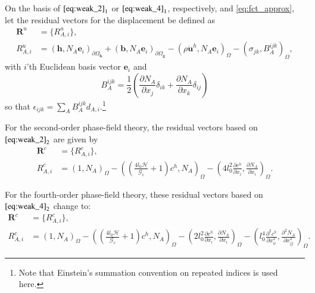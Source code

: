 On the basis of $\eqref{eq:weak_2}_{1}$ or $\eqref{eq:weak_4}_{1}$, respectively, and \eqref{eq:fct_approx}, let the residual vectors for the displacement be defined as
\begin{equation} \label{eq:res_vecs_u}
	\begin{aligned}
		\mathbf{R}^{u}&=\{R_{A,i}^{u}\}, \\
		R_{A,i}^{u} &= \left(\mathbf{h},N_{A}\mathbf{e}_{i}\right)_{\partial\Omega_{\mathbf{h}}} + \left(\mathbf{b},N_{A}\mathbf{e}_{i}\right)_{\partial\Omega_{\mathbf{g}}} - \left(\rho\ddot{\mathbf{u}}^{h},N_{A}\mathbf{e}_{i}\right)_{\Omega}-\left(\sigma_{jk},B_{A}^{ijk}\right)_{\Omega},
	\end{aligned}
\end{equation}
with $i$'th Euclidean basis vector $\mathbf{e}_{i}$ and
\begin{equation}
	B_{A}^{ijk}=\frac{1}{2}\left(\frac{\partial N_{A}}{\partial x_{j}}\delta_{ik}+\frac{\partial N_{A}}{\partial x_{k}}\delta_{ij}\right)
\end{equation}
so that $\epsilon_{ijk}=\sum_{A}B_{A}^{ijk}d_{A,i}$.\footnote{Note that Einstein's summation convention on repeated indices is used here.}

For the second-order phase-field theory, the residual vectors based on $\eqref{eq:weak_2}_{2}$ are given by
\begin{equation} \label{eq:res_vecs_c2}
	\begin{aligned}
		\mathbf{R}^{c}&=\{R_{A,i}^{c}\}, \\
		R_{A,i}^{c} &= \left(1,N_{A}\right)_{\Omega} - \left(\left(\frac{4l_{0}\mathcal{H}}{\mathcal{G}_{c}}+1\right)c^{h},N_{A}\right)_{\Omega} - \left(4l_{0}^{2}\frac{\partial c^{h}}{\partial x_{i}},\frac{\partial N_{A}}{\partial x_{i}}\right)_{\Omega}.
	\end{aligned}
\end{equation}

For the fourth-order phase-field theory, these residual vectors based on $\eqref{eq:weak_4}_{2}$ change to:
\begin{equation} \label{eq:res_vecs_c4}
	\begin{aligned}
		\mathbf{R}^{c}&=\{R_{A,i}^{c}\}, \\
		R_{A,i}^{c} &= \left(1,N_{A}\right)_{\Omega} - \left(\left(\frac{4l_{0}\mathcal{H}}{\mathcal{G}_{c}}+1\right)c^{h},N_{A}\right)_{\Omega} - \left(2l_{0}^{2}\frac{\partial c^{h}}{\partial x_{i}},\frac{\partial N_{A}}{\partial x_{i}}\right)_{\Omega} - \left(l_{0}^{4}\frac{\partial^{2}c^{h}}{\partial x_{ii}^{2}},\frac{\partial^{2}N_{A}}{\partial x_{jj}^{2}}\right)_{\Omega}.
	\end{aligned}
\end{equation}

